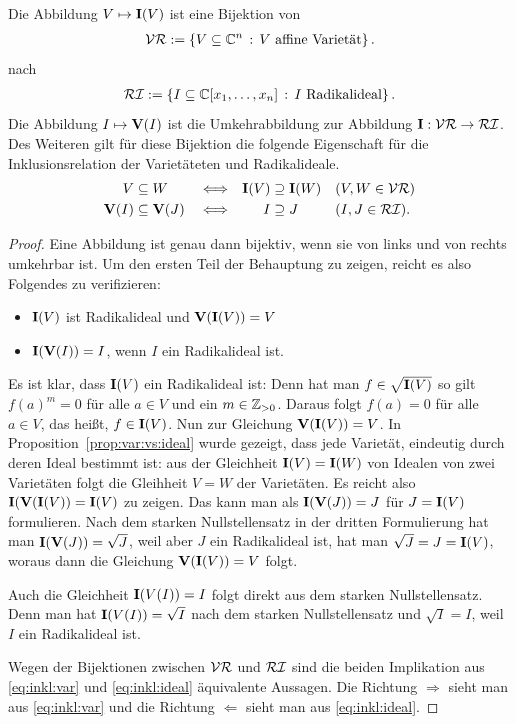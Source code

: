 \documentclass[11pt]{article}
\numberwithin{equation}{section}
\begin{document}
\begin{theorem} \label{bij:radikalid:var} Die Abbildung $V \mapsto \mathbf{I}(V)$ ist eine Bijektion von
	\begin{align*}
		\operatorname{\mathcal{VR}} := \left\{ V \subseteq \mathbb{C}^n \,:\, V \ \text{affine Varietät} \right\}. 
	\end{align*} 
	nach 
	\begin{align*}
		\RI  := \setcond{ I \subseteq \C[x_1,\ldots,x_n]}{I \ \text{Radikalideal}}. 
	\end{align*}
	Die Abbildung $I \mapsto \mathbf{V}(I)$ ist die Umkehrabbildung zur Abbildung $\mathbf{I} :  \operatorname{\mathcal{VR}} \to \operatorname{\mathcal{RI}}$. Des Weiteren gilt für diese Bijektion die folgende Eigenschaft für die Inklusionsrelation der Varietäteten und Radikalideale. 
	\begin{align} \label{eq:inkl:var}
		 V & \subseteq W  & & \Longleftrightarrow & \mathbf{I}(V) & \supseteq \mathbf{I}(W) & & (V,W \in \operatorname{\mathcal{VR}})
		 \\
		\label{eq:inkl:ideal}
		\mathbf{V}(I) & \subseteq \mathbf{V}(J) & & \Longleftrightarrow & I & \supseteq J  & & (I,J \in \operatorname{\mathcal{RI}}). 
	\end{align}	
\end{theorem} 
\begin{proof}
	Eine Abbildung ist genau dann bijektiv, wenn sie von links und von rechts umkehrbar ist. Um den ersten Teil der Behauptung zu zeigen, reicht es also Folgendes zu verifizieren: 
	\begin{itemize}
		\item $\mathbf{I}(V)$ ist Radikalideal und $\mathbf{V}(\mathbf{I}(V))= V$ 
		\item $\mathbf{I}(\mathbf{V}(I)) = I$, wenn $I$ ein Radikalideal ist. 
	\end{itemize} 
	
	Es ist klar, dass $\mathbf{I}(V)$ ein Radikalideal ist:  Denn hat man $f \in \sqrt{\mathbf{I}(V)}$ so gilt $f(a)^m=0$ für alle $a \in V$ und ein $m \in \mathbb{Z}_{>0}$. Daraus folgt $f(a) =0$ für alle $a \in V$, das heißt, $f \in \mathbf{I}(V)$. Nun zur Gleichung $\mathbf{V}(\mathbf{I}(V))= V$. In Proposition~\ref{prop:var:vs:ideal} wurde gezeigt, dass jede Varietät, eindeutig durch deren Ideal bestimmt ist: aus der Gleichheit $\mathbf{I}(V) = \mathbf{I}(W)$ von Idealen von zwei Varietäten folgt die Gleihheit $V=W$ der Varietäten. Es reicht also $\mathbf{I}(\mathbf{V}(\mathbf{I}(V))= \mathbf{I}(V)$ zu zeigen. Das kann man als $\mathbf{I}(\mathbf{V}(J)) = J$ für $J = \mathbf{I}(V)$ formulieren. Nach dem starken Nullstellensatz in der dritten Formulierung hat man $\mathbf{I}(\mathbf{V}(J)) =\sqrt{J}$, weil aber $J$ ein Radikalideal ist, hat man $\sqrt{J} = J = \mathbf{I}(V)$, woraus dann die Gleichung $\mathbf{V}(\mathbf{I}(V)) = V$ folgt. 
	
	Auch die Gleichheit $\mathbf{I}(V(I)) = I$ folgt direkt aus dem starken Nullstellensatz. Denn man hat $\mathbf{I}(V(I)) = \sqrt{I}$ nach dem starken Nullstellensatz und $\sqrt{I} = I$, weil $I$ ein Radikalideal ist. 
	
	Wegen der Bijektionen zwischen $\operatorname{\mathcal{VR}}$ und $\operatorname{\mathcal{RI}}$ sind die beiden Implikation aus \eqref{eq:inkl:var} und \eqref{eq:inkl:ideal} äquivalente Aussagen. Die Richtung $\Rightarrow$ sieht man aus \eqref{eq:inkl:var} und die Richtung $\Leftarrow$ sieht man aus \eqref{eq:inkl:ideal}. 
\end{proof} 
\end{document}
